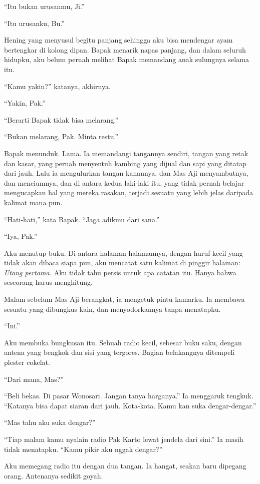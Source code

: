 \documentclass[11pt,twoside,openany]{book}
\makeatletter
\newcommand{\scenebreak}{\par\vspace{0.9em}{\centering\textsc{*\hspace{0.7em}*\hspace{0.7em}*}\par}\vspace{0.9em}\@afterindentfalse\@afterheading}
\makeatother
\begin{document}
``Itu bukan urusanmu, Ji.''

``Itu urusanku, Bu.''

Hening yang menyusul begitu panjang sehingga aku bisa mendengar ayam bertengkar di kolong dipan. Bapak menarik napas panjang, dan dalam seluruh hidupku, aku belum pernah melihat Bapak memandang anak sulungnya selama itu.

``Kamu yakin?'' katanya, akhirnya.

``Yakin, Pak.''

``Berarti Bapak tidak bisa melarang.''

``Bukan melarang, Pak. Minta restu.''

Bapak menunduk. Lama. Ia memandangi tangannya sendiri, tangan yang retak dan kasar, yang pernah menyentuh kambing yang dijual dan sapi yang ditatap dari jauh. Lalu ia mengulurkan tangan kanannya, dan Mas Aji menyambutnya, dan menciumnya, dan di antara kedua laki-laki itu, yang tidak pernah belajar mengucapkan hal yang mereka rasakan, terjadi sesuatu yang lebih jelas daripada kalimat mana pun.

``Hati-hati,'' kata Bapak. ``Jaga adikmu dari sana.''

``Iya, Pak.''

Aku menutup buku. Di antara halaman-halamannya, dengan huruf kecil yang tidak akan dibaca siapa pun, aku mencatat satu kalimat di pinggir halaman: \emph{Utang pertama.} Aku tidak tahu persis untuk apa catatan itu. Hanya bahwa seseorang harus menghitung.

\scenebreak
Malam sebelum Mas Aji berangkat, ia mengetuk pintu kamarku. Ia membawa sesuatu yang dibungkus kain, dan menyodorkannya tanpa menatapku.

``Ini.''

Aku membuka bungkusan itu. Sebuah radio kecil, sebesar buku saku, dengan antena yang bengkok dan sisi yang tergores. Bagian belakangnya ditempeli plester cokelat.

``Dari mana, Mas?''

``Beli bekas. Di pasar Wonosari. Jangan tanya harganya.'' Ia menggaruk tengkuk. ``Katanya bisa dapat siaran dari jauh. Kota-kota. Kamu kan suka dengar-dengar.''

``Mas tahu aku suka dengar?''

``Tiap malam kamu nyalain radio Pak Karto lewat jendela dari sini.'' Ia masih tidak menatapku. ``Kamu pikir aku nggak dengar?''

Aku memegang radio itu dengan dua tangan. Ia hangat, seakan baru dipegang orang. Antenanya sedikit goyah.
\end{document}
